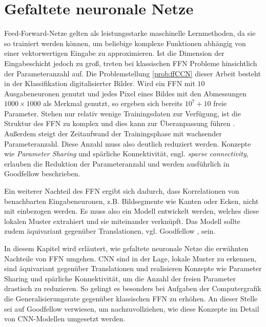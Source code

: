 \chapter{Gefaltete neuronale Netze}
\label{kap:CNN}

Feed-Forward-Netze gelten als leistungsstarke maschinelle Lernmethoden, da sie so trainiert werden können, um beliebige komplexe Funktionen abhängig von einer vektorwertigen Eingabe zu approximieren. Ist die Dimension der Eingabeschicht jedoch zu groß, treten bei klassischen FFN Probleme hinsichtlich der Parameteranzahl auf. Die Problemstellung \ref{prob:ffCCN} dieser Arbeit besteht in der Klassifikation digitalisierter Bilder. Wird ein FFN mit $10$ Ausgabeneuronen genutzt und jedes Pixel eines Bildes mit den Abmessungen $1000 \times 1000$ als Merkmal genutzt, so ergeben sich bereits $10^7+10$ freie Parameter. Stehen nur relativ wenige Trainingsdaten zur Verfügung, ist die Struktur des FFN zu komplex und dies kann zur Überanpassung führen \cite{caruana2000overfitting,bilbao2017overfitting}. Außerdem steigt der Zeitaufwand der Trainingsphase mit wachsender Parameteranzahl. Diese Anzahl muss also deutlich reduziert werden. 
Konzepte wie \textit{Parameter Sharing} und spärliche Konnektivität, engl. \textit{sparse connectivity}, erlauben die Reduktion der Parameteranzahl und werden ausführlich in Goodfellow \cite{Goodfellow-et-al-2016} beschrieben.

Ein weiterer Nachteil des FFN ergibt sich dadurch, dass Korrelationen von benachbarten Eingabeneuronen, z.B. Bildsegmente wie Kanten oder Ecken, nicht mit einbezogen werden. Es muss also ein Modell entwickelt werden, welches diese lokalen Muster extrahiert und sie miteinander verknüpft. Das Modell sollte zudem äquivariant gegenüber Translationen, vgl. Goodfellow \cite{Goodfellow-et-al-2016}, sein.

In diesem Kapitel wird erläutert, wie gefaltete neuronale Netze die erwähnten Nachteile von FFN umgehen. CNN sind in der Lage, lokale Muster zu erkennen, sind äquivariant gegenüber Translationen und realisieren Konzepte wie Parameter Sharing und spärliche Konnektivität, um die Anzahl der freien Parameter drastisch zu reduzieren. So gelingt es besonders bei Aufgaben der Computergrafik \cite{DBLP:conf/nips/KrizhevskySH12, DBLP:journals/pieee/LeCunBBH98,DBLP:conf/cvpr/CiresanMS12} die Generalisierungsrate gegenüber klassischen FFN zu erhöhen. An dieser Stelle sei auf Goodfellow \cite{Goodfellow-et-al-2016} verwiesen, um nachzuvollziehen, wie diese Konzepte im Detail von CNN-Modellen umgesetzt werden.

